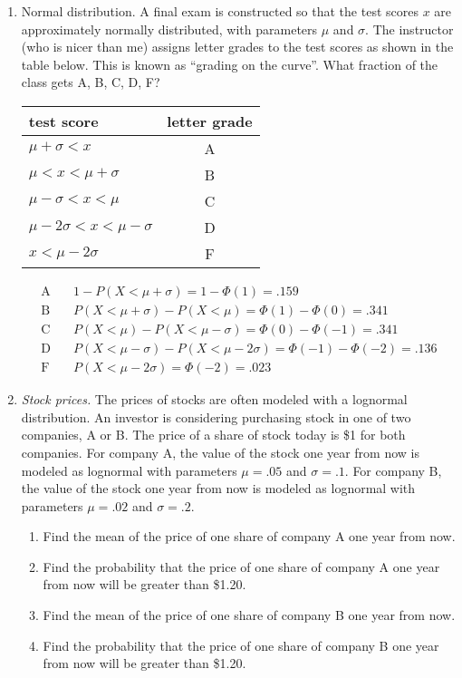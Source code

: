 \begin{enumerate}
\item Normal distribution. A final exam is constructed so that the
  test scores $x$ are approximately normally distributed, with
  parameters $\mu$ and $\sigma$. The instructor (who is nicer than me)
  assigns letter grades to the test scores as shown in the table
  below. This is known as ``grading on the curve''. What fraction of
  the class gets A, B, C, D, F?

\begin{tabular}{lc}
test score & letter grade \\ \hline
$\mu+\sigma < x$ & A \\
$\mu < x < \mu+\sigma$ & B \\
$\mu-\sigma < x < \mu$ & C \\
$\mu-2\sigma < x < \mu-\sigma$ & D \\
$x < \mu-2\sigma$ & F
\end{tabular}

\vspace{.1in}
\begin{solution}
\bs
\begin{align*}
\text{A}&\quad 1-P(X<\mu+\sigma)=1-\Phi(1) = .159 \\
\text{B}&\quad P(X<\mu+\sigma)-P(X<\mu)=\Phi(1)-\Phi(0) = .341 \\
\text{C}&\quad P(X<\mu)-P(X<\mu-\sigma)=\Phi(0)-\Phi(-1)=.341 \\
\text{D}&\quad P(X<\mu-\sigma)-P(X<\mu-2\sigma)=\Phi(-1)-\Phi(-2)=.136 \\
\text{F}&\quad P(X<\mu-2\sigma)=\Phi(-2) = .023
\end{align*}
\end{solution}

\item \emph{Stock prices.} The prices of stocks are often modeled
  with a lognormal distribution. An investor is considering purchasing
  stock in one of two companies, A or B. The price of a share of stock
  today is \$1 for both companies. For company A, the value of the
  stock one year from now is modeled as lognormal with parameters
  $\mu=.05$ and $\sigma=.1$. For company B, the value of the stock one
  year from now is modeled as lognormal with parameters $\mu=.02$ and
  $\sigma=.2$.
\begin{enumerate}
\item Find the mean of the price of one share of company A one year
  from now. \label{a1}
\item Find the probability that the price of one share of company A
  one year from now will be greater than \$1.20. \label{a2}
\item Find the mean of the price of one share of company B one year
  from now. \label{b1}
\item Find the probability that the price of one share of company B
  one year from now will be greater than \$1.20. \label{b2}
\end{enumerate}


\end{enumerate}
